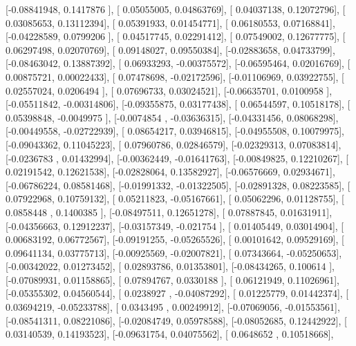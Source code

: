\documentclass{article}
\begin{document}
       [-0.08841948,  0.1417876 ],
       [ 0.05055005,  0.04863769],
       [ 0.04037138,  0.12072796],
       [ 0.03085653,  0.13112394],
       [ 0.05391933,  0.01454771],
       [ 0.06180553,  0.07168841],
       [-0.04228589,  0.0799206 ],
       [ 0.04517745,  0.02291412],
       [ 0.07549002,  0.12677775],
       [ 0.06297498,  0.02070769],
       [ 0.09148027,  0.09550384],
       [-0.02883658,  0.04733799],
       [-0.08463042,  0.13887392],
       [ 0.06933293, -0.00375572],
       [-0.06595464,  0.02016769],
       [ 0.00875721,  0.00022433],
       [ 0.07478698, -0.02172596],
       [-0.01106969,  0.03922755],
       [ 0.02557024,  0.0206494 ],
       [ 0.07696733,  0.03024521],
       [-0.06635701,  0.0100958 ],
       [-0.05511842, -0.00314806],
       [-0.09355875,  0.03177438],
       [ 0.06544597,  0.10518178],
       [ 0.05398848, -0.0049975 ],
       [-0.0074854 , -0.03636315],
       [-0.04331456,  0.08068298],
       [-0.00449558, -0.02722939],
       [ 0.08654217,  0.03946815],
       [-0.04955508,  0.10079975],
       [-0.09043362,  0.11045223],
       [ 0.07960786,  0.02846579],
       [-0.02329313,  0.07083814],
       [-0.0236783 ,  0.01432994],
       [-0.00362449, -0.01641763],
       [-0.00849825,  0.12210267],
       [ 0.02191542,  0.12621538],
       [-0.02828064,  0.13582927],
       [-0.06576669,  0.02934671],
       [-0.06786224,  0.08581468],
       [-0.01991332, -0.01322505],
       [-0.02891328,  0.08223585],
       [ 0.07922968,  0.10759132],
       [ 0.05211823, -0.05167661],
       [ 0.05062296,  0.01128755],
       [ 0.0858448 ,  0.1400385 ],
       [-0.08497511,  0.12651278],
       [ 0.07887845,  0.01631911],
       [-0.04356663,  0.12912237],
       [-0.03157349, -0.021754  ],
       [ 0.01405449,  0.03014904],
       [ 0.00683192,  0.06772567],
       [-0.09191255, -0.05265526],
       [ 0.00101642,  0.09529169],
       [ 0.09641134,  0.03775713],
       [-0.00925569, -0.02007821],
       [ 0.07343664, -0.05250653],
       [-0.00342022,  0.01273452],
       [ 0.02893786,  0.01353801],
       [-0.08434265,  0.100614  ],
       [-0.07089931,  0.01158865],
       [ 0.07894767,  0.0330188 ],
       [ 0.06121949,  0.11026961],
       [-0.05355302,  0.04560544],
       [ 0.0238927 , -0.04087292],
       [ 0.01225779,  0.01442374],
       [ 0.03694219, -0.05233788],
       [ 0.0343495 ,  0.00249912],
       [-0.07069056, -0.01553561],
       [-0.08541311,  0.08221086],
       [-0.02084749,  0.05978588],
       [-0.08052685,  0.12442922],
       [ 0.03140539,  0.14193523],
       [-0.09631754,  0.04075562],
       [ 0.0648652 ,  0.10518668],
\end{document}
